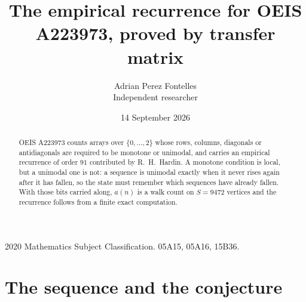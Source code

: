 \documentclass[11pt,a4paper]{article}
\title{The empirical recurrence for OEIS A223973, proved by transfer matrix}
\author{Adrian Perez Fontelles\\ \small Independent researcher}
\date{14 September 2026}
\theoremstyle{plain}
\theoremstyle{definition}
\begin{document}
\maketitle

\begin{abstract}
OEIS A223973 counts arrays over $\{0,\dots,2\}$ whose rows, columns, diagonals or
antidiagonals are required to be monotone or unimodal, and carries an empirical recurrence of
order $91$ contributed by R.~H.~Hardin. A monotone condition is local, but a unimodal one
is not: a sequence is unimodal exactly when it never rises again after it has fallen, so the
state must remember which sequences have already fallen. With those bits carried along, $a(n)$
is a walk count on $S=9472$ vertices and the recurrence follows from a finite exact
computation.
\end{abstract}

\noindent\small 2020 Mathematics Subject Classification. 05A15, 05A16, 15B36.\normalsize

\section{The sequence and the conjecture}
\end{document}
